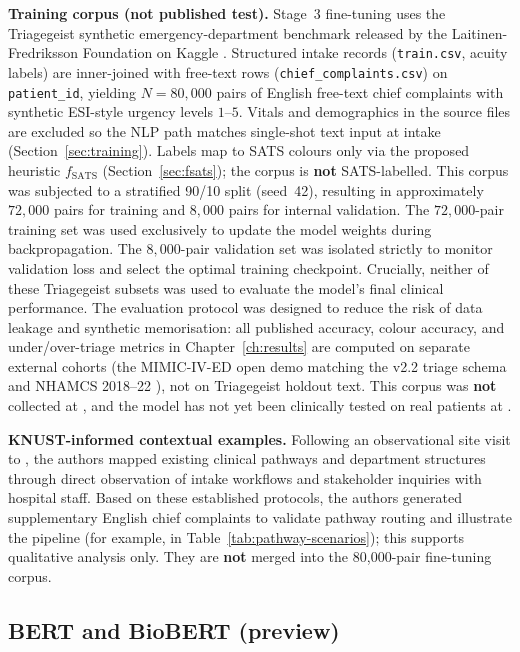 \textbf{Training corpus (not published test).} Stage~3 fine-tuning uses the Triagegeist synthetic emergency-department benchmark released by the Laitinen-Fredriksson Foundation on Kaggle \citep{triagegeist2025}. Structured intake records (\texttt{train.csv}, acuity labels) are inner-joined with free-text rows (\texttt{chief\_complaints.csv}) on \texttt{patient\_id}, yielding \(N=80{,}000\) pairs of English free-text chief complaints with synthetic ESI-style urgency levels \(1\)--\(5\). Vitals and demographics in the source files are excluded so the NLP path matches single-shot text input at intake (Section~\ref{sec:training}). Labels map to SATS colours only via the proposed heuristic \(f_{\mathrm{SATS}}\) (Section~\ref{sec:fsats}); the corpus is \textbf{not} SATS-labelled. This corpus was subjected to a stratified 90/10 split (seed~42), resulting in approximately \(72{,}000\) pairs for training and \(8{,}000\) pairs for internal validation. The \(72{,}000\)-pair training set was used exclusively to update the model weights during backpropagation. The \(8{,}000\)-pair validation set was isolated strictly to monitor validation loss and select the optimal training checkpoint. Crucially, neither of these Triagegeist subsets was used to evaluate the model's final clinical performance. The evaluation protocol was designed to reduce the risk of data leakage and synthetic memorisation: all published accuracy, colour accuracy, and under/over-triage metrics in Chapter~\ref{ch:results} are computed on separate external cohorts (the MIMIC-IV-ED open demo matching the v2.2 triage schema \citep{mimiciveddemo2023,mimicived2023} and NHAMCS 2018--22 \citep{nhamcs201822}), not on Triagegeist holdout text. This corpus was \textbf{not} collected at \examplehospital{}, and the model has not yet been clinically tested on real patients at \examplehospital{}.

\textbf{KNUST-informed contextual examples.} Following an observational site visit to \examplehospital{}, the authors mapped existing clinical pathways and department structures through direct observation of intake workflows and stakeholder inquiries with hospital staff. Based on these established protocols, the authors generated supplementary English chief complaints to validate pathway routing and illustrate the pipeline (for example, \runningcomplaint{} in Table~\ref{tab:pathway-scenarios}); this supports qualitative analysis only. They are \textbf{not} merged into the 80{,}000-pair fine-tuning corpus.

\subsection{BERT and BioBERT (preview)}
\label{sec:biobert-preview}

